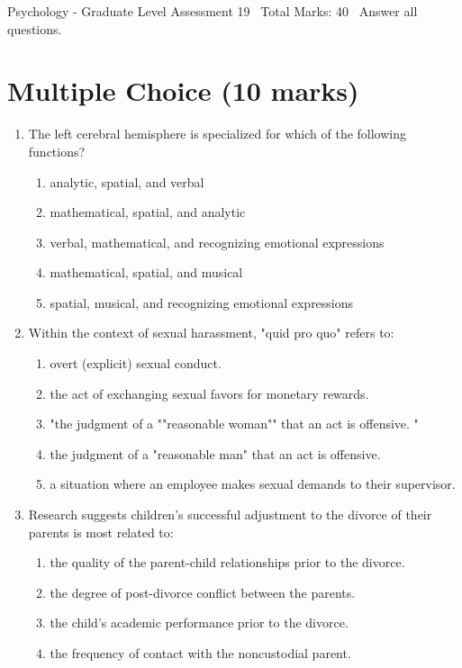 \documentclass[12pt]{article}
\begin{document}
\begin{center}
Psychology - Graduate Level Assessment 19 \
Total Marks: 40 \
Answer all questions.
\end{center}

\section*{Multiple Choice (10 marks)}
\begin{enumerate}[label=\arabic*.]
\item The left cerebral hemisphere is specialized for which of the following functions?
\begin{enumerate}[label=(\alph*)]
    \item analytic, spatial, and verbal
    \item mathematical, spatial, and analytic
    \item verbal, mathematical, and recognizing emotional expressions
    \item mathematical, spatial, and musical
    \item spatial, musical, and recognizing emotional expressions
\end{enumerate}
\item Within the context of sexual harassment, "quid pro quo" refers to:
\begin{enumerate}[label=(\alph*)]
    \item overt (explicit) sexual conduct.
    \item the act of exchanging sexual favors for monetary rewards.
    \item "the judgment of a ""reasonable woman"" that an act is offensive. "
    \item the judgment of a "reasonable man" that an act is offensive.
    \item a situation where an employee makes sexual demands to their supervisor.
\end{enumerate}
\item Research suggests children's successful adjustment to the divorce of their parents is most related to:
\begin{enumerate}[label=(\alph*)]
    \item the quality of the parent-child relationships prior to the divorce.
    \item the degree of post-divorce conflict between the parents.
    \item the child's academic performance prior to the divorce.
    \item the frequency of contact with the noncustodial parent.

\end{enumerate}
\end{enumerate}
\end{document}
